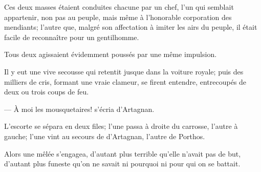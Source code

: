 Ces deux masses étaient conduites chacune par un chef, l'un qui semblait appartenir, non pas au peuple, mais même à l'honorable corporation des mendiants; l'autre que, malgré son affectation à imiter les airs du peuple, il était facile de reconnaître pour un gentilhomme.

Tous deux agissaient évidemment poussés par une même impulsion.

Il y eut une vive secousse qui retentit jusque dans la voiture royale; puis des milliers de cris, formant une vraie clameur, se firent entendre, entrecoupés de deux ou trois coups de feu.

— À moi les mousquetaires! s'écria d'Artagnan.

L'escorte se sépara en deux files; l'une passa à droite du carrosse, l'autre à gauche; l'une vint au secours de d'Artagnan, l'autre de Porthos.

Alors une mêlée s'engagea, d'autant plus terrible qu'elle n'avait pas de but, d'autant plus funeste qu'on ne savait ni pourquoi ni pour qui on se battait.